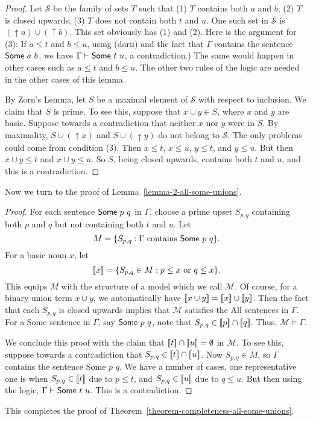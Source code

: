 \documentclass[12pt]{article}
\theoremstyle{definition}
\newcommand{\semantics}[1]{[\![\mbox{\em $ #1 $\/}]\!]}
\newcommand{\Model}{\mathcal{M}}
\renewcommand{\SS}{\mathcal{S}}
\newcommand{\set}[1]{\{ #1 \}}
\newcommand{\proves}{\vdash}
\begin{document}
\begin{proof}
Let $\SS$ be the family of sets $T$ such that (1) $T$ contains both $a$ and $b$;
(2) $T$ is closed upwards;
(3) $T$  does not contain both $t$ and $u$.
One such set in $\SS$ is $(\uparrow a)\cup (\uparrow b)$.  
  This set obviously has (1) and (2).
Here is the argument for (3):
 If $a\leq t$
and $b\leq u$, using ({\sc darii})
and 
 the fact that $\Gamma$ contains the sentence $\mbox{\sf Some $a$ $b$}$,
 we have
 $\Gamma\proves  \mbox{\sf Some $t$ $u$}$, a contradiction.)
The same would happen in other cases such as $a\leq t$ and $b\leq u$.
The other two rules of the logic are needed in the other cases of this lemma.

By Zorn's Lemma, let $S$ be a maximal element of $\SS$ with respect to inclusion.
We claim that 
$S$ is  prime.   To see this, suppose that $x \cup y\in S$,
where $x$ and $y$ are basic.
Suppose towards a contradiction that neither $x$ nor $y$ were in $S$.
By maximality, $S\cup(\uparrow x)$ and $S\cup(\uparrow y)$  do not belong to $\SS$. 
The only problems could come from condition (3).
Then $x\leq t$, $x\leq u$, $y\leq t$, and $y\leq u$.
But then $x\cup y \leq t$ and $x\cup y\leq u$.
So $S$, being closed upwards, contains both $t$ and $u$, and this is a contradiction.
 \end{proof}
 
 Now we turn to the proof of 
 Lemma~\ref{lemma-2-all-some-unions}.
 
 \begin{proof}
 For each sentence $\mbox{\sf Some $p$ $q$}$ in $\Gamma$,
 choose a prime upset $S_{p,q}$ containing both $p$ and $q$
 but not containing both $t$ and $u$.
 Let 
 \[ M = \set{S_{p,q}: \Gamma \mbox{ contains \mbox{\sf Some $p$ $q$}}}.\]
 For a basic noun $x$, let 
 \[\semantics{x} = \set{S_{p,q}
\in M: p\leq x \mbox{ or } q \leq x}.\]
 This equips $M$ with the structure of a model which we call $\Model$.
 Of course, for a binary union term $x\cup y$, 
 we automatically have $\semantics{x\cup y} = \semantics{x} \cup\semantics{y}$.
 Then the fact that each $S_{p,q}$ is closed upwards implies that $\Model$
satisfies the {\sf All} sentences in $\Gamma$.
For a {\sf Some} sentence in $\Gamma$, say $\mbox{\sf Some $p$ $q$}$,
note that $S_{p,q}\in \semantics{p}\cap\semantics{q}$.  
Thus, $\Model\models\Gamma$.   

We conclude this proof with the claim that $\semantics{t}\cap\semantics{u} = \emptyset$
in $\Model$.   To see this, suppose towards a contradiction that $S_{p,q} \in\semantics{t}\cap\semantics{u} $.
Now $S_{p,q}\in M$, so $\Gamma$ contains
the sentence {\sf Some $p$ $q$}.
We have a number of cases, one representative one is when
$S_{p,q} \in\semantics{t}$ due to $p \leq t$,
and $S_{p,q} \in\semantics{u}$ due to $q \leq u$.
But then using the logic, $\Gamma\proves\mbox{\sf Some $t$ $u$}$.
This is a contradiction.
 \end{proof}
 
This completes the proof of Theorem~\ref{theorem-completeness-all-some-unions}. 
 
 
\end{document}
